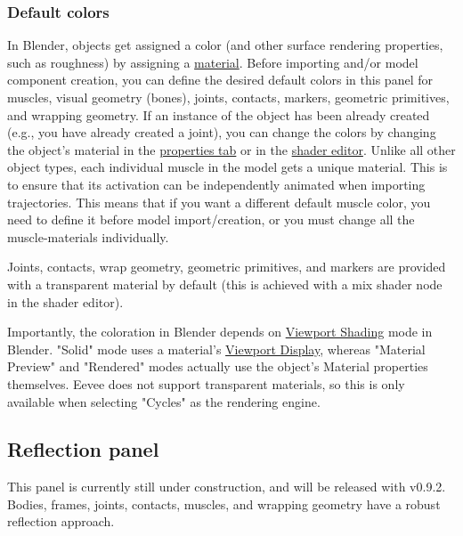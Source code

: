 \documentclass{article}
\begin{document}
\subsubsection{Default colors}
\label{sec:defaultcolors}

In Blender, objects get assigned a color (and other surface rendering properties, such as roughness) by assigning a \href{https://docs.blender.org/manual/en/latest/editors/properties_editor.html}{material}. Before importing and/or model component creation, you can define the desired default colors in this panel for muscles, visual geometry (bones), joints, contacts, markers, geometric primitives, and wrapping geometry. If an instance of the object has been already created (e.g., you have already created a joint), you can change the colors by changing the object's material in the \href{https://docs.blender.org/manual/en/latest/editors/properties_editor.html}{properties tab} or in the \href{https://docs.blender.org/manual/en/latest/editors/shader_editor.html}{shader editor}. Unlike all other object types, each individual muscle in the model gets a unique material. This is to ensure that its activation can be independently animated when importing trajectories. This means that if you want a different default muscle color, you need to define it before model import/creation, or you must change all the muscle-materials individually.

Joints, contacts, wrap geometry, geometric primitives, and markers are provided with a transparent material by default (this is achieved with a mix shader node in the shader editor).

Importantly, the coloration in Blender depends on \href{https://docs.blender.org/manual/en/latest/editors/3dview/display/shading.html}{Viewport Shading} mode in Blender. "Solid" mode uses a material's \href{https://docs.blender.org/manual/en/latest/render/workbench/display_settings.html#properties-material-viewport-display}{Viewport Display}, whereas "Material Preview" and "Rendered" modes actually use the object's Material properties themselves. Eevee does not support transparent materials, so this is only available when selecting "Cycles" as the rendering engine.

\subsection{Reflection panel}

This panel is currently still under construction, and will be released with v0.9.2. Bodies, frames, joints, contacts, muscles, and wrapping geometry have a robust reflection approach.
\end{document}
